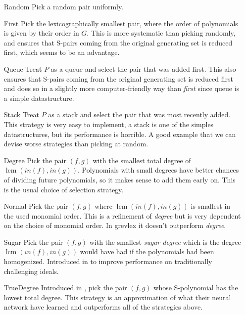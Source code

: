 \documentclass{article}
\theoremstyle{changedot}
\theoremstyle{changedotbreak}
\theoremstyle{nonumberplain}
\DeclareMathOperator{\lcm}{lcm}
\begin{document}
\begin{itemize}
  \item[Random] Pick a random pair uniformly.

  \item[First] Pick the lexicographically smallest pair, where the order of polynomials is given by their order in $G$. This is more systematic than picking randomly, and ensures that S-pairs coming from the original generating set is reduced first, which seems to be an advantage.

  \item[Queue] Treat $P$ as a queue and select the pair that was added first. This also ensures that S-pairs coming from the original generating set is reduced first and does so in a slightly more computer-friendly way than \emph{first} since queue is a simple datastructure.

  \item[Stack] Treat $P$ as a stack and select the pair that was most recently added. This strategy is very easy to implement, a stack is one of the simples datastructures, but its performance is horrible. A good example that we can devise worse strategies than picking at random.

  \item[Degree] Pick the pair $(f, g)$ with the smallest total degree of $\lcm(in(f), in(g))$. Polynomials with small degrees have better chances of dividing future polynomials, so it makes sense to add them early on. This is the usual choice of selection strategy.

  \item[Normal] Pick the pair $(f, g)$ where $\lcm(in(f), in(g))$ is smallest in the used monomial order. This is a refinement of \emph{degree} but is very dependent on the choice of monomial order. In grevlex it doesn't outperform \emph{degree}.

  \item[Sugar] Pick the pair $(f, g)$ with the smallest \emph{sugar degree} which is the degree $\lcm(in(f), in(g))$ would have had if the polynomials had been homogenized. Introduced in \cite{sugar} to improve performance on traditionally challenging ideals.

  \item[TrueDegree] Introduced in \cite{peifer}, pick the pair $(f, g)$ whose S-polynomial has the lowest total degree. This strategy is an approximation of what their neural network have learned and outperforms all of the strategies above.
\end{itemize}
\end{document}
